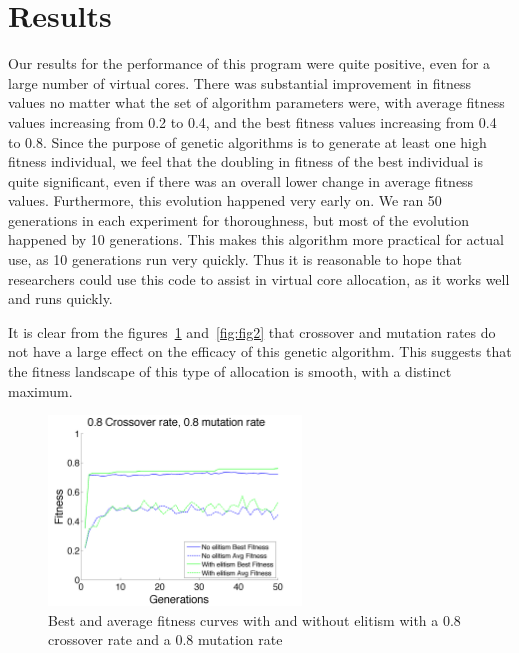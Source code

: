 \documentclass[11pt]{article}
\begin{document}
\section{Results}

Our results for the performance of this program were quite positive, even for a large number of virtual cores. There was substantial improvement in fitness values no matter what the set of algorithm parameters were, with average fitness values increasing from 0.2 to 0.4, and the best fitness values increasing from 0.4 to 0.8. Since the purpose of genetic algorithms is to generate at least one high fitness individual, we feel that the doubling in fitness of the best individual is quite significant, even if there was an overall lower change in average fitness values. Furthermore, this evolution happened very early on. We ran 50 generations in each experiment for thoroughness, but most of the evolution happened by 10 generations. This makes this algorithm more practical for actual use, as 10 generations run very quickly. Thus it is reasonable to hope that researchers could use this code to assist in virtual core allocation, as it works well and runs quickly. 

It is clear from the figures~\ref{fig:fig1} and~\ref{fig:fig2} that crossover and mutation rates do not have a large effect on the efficacy of this genetic algorithm. This suggests that the fitness landscape of this type of allocation is smooth, with a distinct maximum. 

\begin{figure}[H]
 \centering
  \includegraphics[width=0.6\textwidth,height=0.2\textheight]{figures/fitness08mut08cross.png}
  \caption{Best and average fitness curves with and without elitism with a 0.8 crossover rate and a 0.8 mutation rate}
  \label{fig:fig1}  
\end{figure} 
\end{document}
